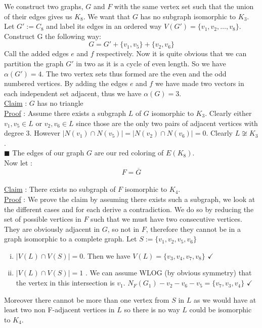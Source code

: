 \documentclass{article}
\begin{document}
	We construct two graphs, $G$ and $F$ with the same vertex set such that the union of their edges gives us $K_8$. We want that $G$ has no subgraph isomorphic to $K_3$. Let $G' := C_8$ and label its edges in an ordered way $V(G') = \{v_1,v_2,\ldots,v_8\}$. Construct G the following way: 
	\[G = G'  + \{v_1,v_5\} + \{v_2,v_6\}\]
	Call the added edges $e$ and $f$ respectively. Now it is quite obvious that we can partition the graph $G'$ in two as it is a cycle of even length. So we have $\alpha(G') = 4$. The two vertex sets thus formed are the even and the odd numbered vertices. By adding the edges $e$ and $f$ we have made two vectors in each independent set adjacent, thus we have $\alpha(G) = 3$. \\
	\underline{Claim} : $G$ has no triangle\\
	\underline{Proof} : Assume there exists a subgraph $L$ of $G$ isomorphic to $K_3$. Clearly either $v_1,v_5 \in L$ or $v_2,v_6 \in L$ since those are the only two pairs of adjacent vertices with degree 3. However $\vert N(v_1) \cap N(v_5) \vert = \vert N(v_2) \cap N(v_6) \vert = 0$. Clearly $L \not \cong K_3$.\\
	$\blacksquare$
	The edges of our graph $G$ are our red coloring of $E(K_8)$.\\
	Now let :
	\[F = \overline{G}\]\\
	\underline{Claim} : There exists no subgraph of $F$ isomorphic to $K_4$.\\
	\underline{Proof} : We prove the claim by assuming there exists such a subgraph, we look at the different cases and for each derive a contradiction. We do so by reducing the set of possible vertices in $F$ such that we must have two consecutive vertices. They are obviously adjacent in $G$, so not in $F$, therefore they cannot be in a graph isomorphic to a complete graph. Let $S:= \{v_1,v_2,v_5,v_6\}$ 
	\begin{enumerate}[(i)]
		\item $\vert V(L) \cap V(S) \vert = 0$. Then we have $V(L) = \{v_3,v_4,v_7,v_8\}$ $\checkmark$
		\item $\vert V(L) \cap V(S) \vert  = 1$ . We can assume WLOG (by obvious symmetry) that the vertex in this intersection is $v_1$. $N_F(G_1) - v_2 - v_6 - v_5 = \{v_7,v_3,v_4\}$ $\checkmark$
	\end{enumerate}
	Moreover there cannot be more than one vertex from $S$ in $L$ as we would have at least two non F-adjacent vertices in $L$ so there is no way $L$ could be isomorphic to $K_4$. \\
\end{document}
